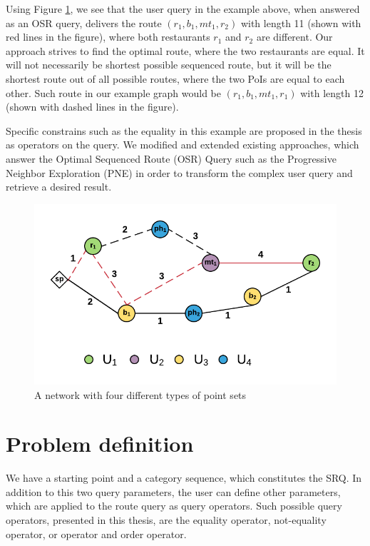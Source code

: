 Using Figure \ref{fig:example}, we see that the user query in the example above, when answered as an OSR query, delivers the route $(r_1, b_1, mt_1, r_2)$ with length 11 (shown with red lines in the figure), where both restaurants $r_1$ and $r_2$ are different. Our approach strives to find the optimal route, where the two restaurants are equal. It will not necessarily be shortest possible sequenced route, but it will be the shortest route out of all possible routes, where the two PoIs are equal to each other. Such route in our example graph would be $(r_1, b_1, mt_1, r_1)$ with length 12 (shown with dashed lines in the figure).

Specific constrains such as the equality in this example are proposed in the thesis as operators on the query. We modified and extended existing approaches, which answer the Optimal Sequenced Route (OSR) Query such as the Progressive Neighbor Exploration (PNE) \cite{OSR} in order to transform the complex user query and retrieve a desired result.

\begin{figure}[h]
	\includegraphics[scale=1]{images/Example_routes.png}
	\centering
	\caption{A network with four different types of point sets}
	\label{fig:example}
\end{figure}

\section{Problem definition}

We have a starting point and a category sequence, which constitutes the SRQ. In addition to this two query parameters, the user can define other parameters, which are applied to the route query as query operators. Such possible query operators, presented in this thesis, are the equality operator, not-equality operator, or operator and order operator. 

